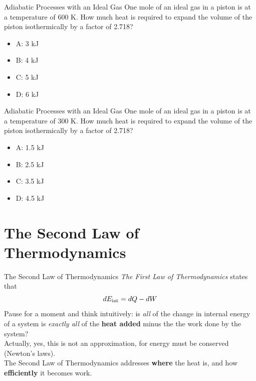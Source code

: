 \documentclass{beamer}
\begin{document}
\begin{frame}{Adiabatic Processes with an Ideal Gas}
One mole of an ideal gas in a piston is at a temperature of 600 K.  How much heat is required to expand the volume of the piston isothermically by a factor of 2.718?
\begin{itemize}
\item A: 3 kJ
\item B: 4 kJ
\item C: 5 kJ
\item D: 6 kJ
\end{itemize}
\end{frame}

\begin{frame}{Adiabatic Processes with an Ideal Gas}
One mole of an ideal gas in a piston is at a temperature of 300 K.  How much heat is required to expand the volume of the piston isothermically by a factor of 2.718?
\begin{itemize}
\item A: 1.5 kJ
\item B: 2.5 kJ
\item C: 3.5 kJ
\item D: 4.5 kJ
\end{itemize}
\end{frame}

\section{The Second Law of Thermodynamics}

\begin{frame}{The Second Law of Thermodynamics}
\textit{The First Law of Thermodynamics} states that
\begin{equation}
dE_{\rm int} = dQ - dW
\end{equation}
Pause for a moment and think intuitively: is \textit{all} of the change in internal energy of a system is \textit{exactly all} of the \textbf{heat added} minus the the work done by the system? \\ \vspace{0.5cm}
Actually, yes, this is not an approximation, for energy must be conserved (Newton's laws). \\ \vspace{0.5cm}
\alert{The Second Law of Thermodynamics} addresses \textbf{where} the heat is, and how \textbf{efficiently} it becomes work.
\end{frame}
\end{document}
